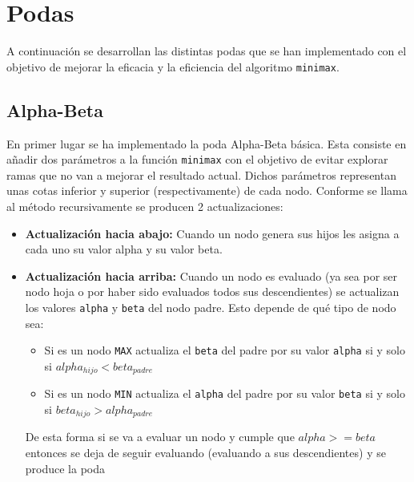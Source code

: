 \documentclass[12pt]{article}
\begin{document}
    \portada[%
        titulo=Inteligencia Artificial,
        subtitulo=Memoria de la Práctica 3,
        autor=Jesús Muñoz Velasco,
        año=Curso 2024-2025]

    \thispagestyle{empty}
    \tableofcontents
    
    \newpage

    \section{Podas}
    A continuación se desarrollan las distintas podas que se han implementado con el objetivo de mejorar la eficacia y la eficiencia del algoritmo \verb|minimax|.

    \subsection{Alpha-Beta}
    En primer lugar se ha implementado la poda Alpha-Beta básica. Esta consiste en añadir dos parámetros a la función \verb|minimax| con el objetivo de evitar explorar ramas que no van a mejorar el resultado actual. Dichos parámetros representan unas cotas inferior y superior (respectivamente) de cada nodo. Conforme se llama al método recursivamente se producen 2 actualizaciones:

    \begin{itemize}
        \item \textbf{Actualización hacia abajo:} Cuando un nodo genera sus hijos les asigna a cada uno su valor alpha y su valor beta.
        \item \textbf{Actualización hacia arriba:} Cuando un nodo es evaluado (ya sea por ser nodo hoja o por haber sido evaluados todos sus descendientes) se actualizan los valores \verb|alpha| y \verb|beta| del nodo padre. Esto depende de qué tipo de nodo sea:
        \begin{itemize}
            \item Si es un nodo \verb|MAX| actualiza el \verb|beta| del padre por su valor \verb|alpha| si y solo si $alpha_{hijo} < beta_{padre}$
            \item Si es un nodo \verb|MIN| actualiza el \verb|alpha| del padre por su valor \verb|beta| si y solo si $beta_{hijo} > alpha_{padre}$
        \end{itemize}
        De esta forma si se va a evaluar un nodo y cumple que $alpha>=beta$ entonces se deja de seguir evaluando (evaluando a sus descendientes) y se produce la poda
    \end{itemize}
\end{document}
